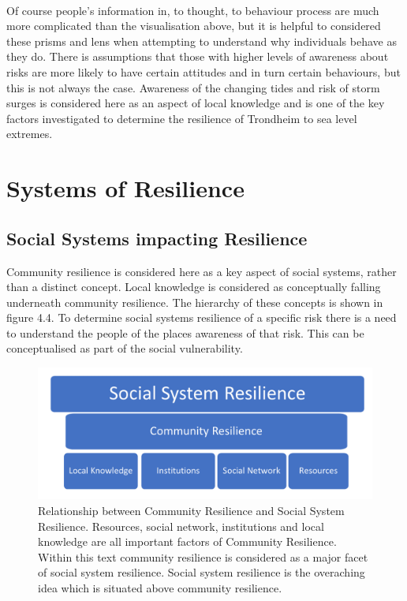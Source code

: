 \paragraph{}
Of course people's information in, to thought, to behaviour process are much more complicated than the visualisation above, but it is helpful to considered these prisms and lens when attempting to understand why individuals behave as they do. There is assumptions that those with higher levels of awareness about risks are more likely to have certain attitudes and in turn certain behaviours, but this is not always the case. \cite{lujala_climate_2015}  Awareness of the changing tides and risk of storm surges is considered here as an aspect of local knowledge and is one of the key factors investigated to determine the resilience of Trondheim to sea level extremes. 

\section{Systems of Resilience }

\subsection{Social Systems impacting Resilience}
Community resilience is considered here as a key aspect of social systems, rather than a distinct concept. Local knowledge is considered as conceptually falling underneath community resilience. The hierarchy of these concepts is shown in figure 4.4. To determine social systems resilience of a specific risk there is a need to understand the people of the places awareness of that risk. This can be conceptualised as part of the social vulnerability.


\begin{figure}[h]
    \centering
    \includegraphics[width=1\textwidth]{fig_theory/social system hierarchy.png}
    \caption{Relationship between Community Resilience and Social System Resilience. Resources, social network, institutions and local knowledge are all important factors of Community Resilience. Within this text community resilience is considered as a major facet of social system resilience. Social system resilience is the overaching idea which is situated above community resilience.}
    \label{fig:social_resilience}
\end{figure}
